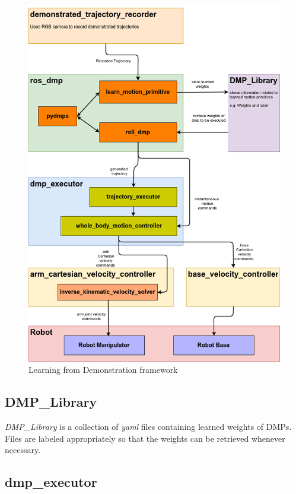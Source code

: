 \begin{figure}[H]
	\includegraphics[width=\textwidth]{images/framework.png}
	\caption{Learning from Demonstration framework}
	\label{fig:framework}
\end{figure}


\subsection{DMP\_Library} \textit{DMP\_Library} is a collection of \textit{yaml} files containing learned weights of DMPs. Files are labeled appropriately so that the weights can be retrieved whenever necessary.



\subsection{dmp\_executor}


